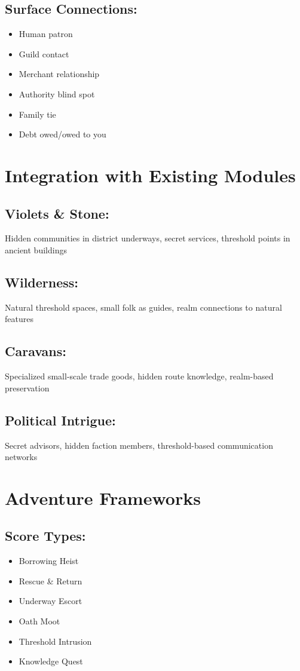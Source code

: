 \documentclass[11pt,letterpaper]{article}
\begin{document}
\subsection*{Surface Connections:}
\begin{itemize}[leftmargin=*]
\item Human patron
\item Guild contact
\item Merchant relationship
\item Authority blind spot
\item Family tie
\item Debt owed/owed to you
\end{itemize}

\section{Integration with Existing Modules}

\subsection*{Violets \& Stone:}
Hidden communities in district underways, secret services, threshold points in ancient buildings

\subsection*{Wilderness:}
Natural threshold spaces, small folk as guides, realm connections to natural features

\subsection*{Caravans:}
Specialized small-scale trade goods, hidden route knowledge, realm-based preservation

\subsection*{Political Intrigue:}
Secret advisors, hidden faction members, threshold-based communication networks

\section{Adventure Frameworks}

\subsection*{Score Types:}
\begin{itemize}[leftmargin=*]
\item Borrowing Heist
\item Rescue \& Return  
\item Underway Escort
\item Oath Moot
\item Threshold Intrusion
\item Knowledge Quest
\end{itemize}
\end{document}

